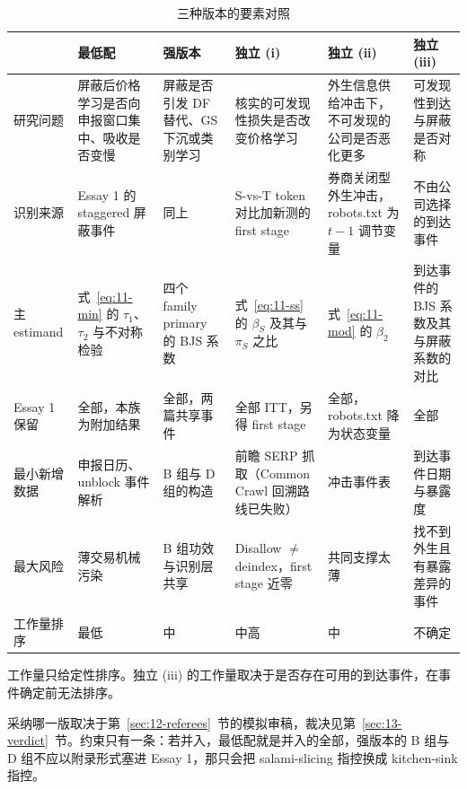 \documentclass[a4paper,11pt]{ctexart}
\begin{document}
\begin{table}[htbp]
\centering
\begin{threeparttable}
\caption{三种版本的要素对照}\label{tab:11-versions}
\footnotesize
\begin{tabular}{>{\raggedright\arraybackslash}p{1.7cm}>{\raggedright\arraybackslash}p{2.4cm}>{\raggedright\arraybackslash}p{2.4cm}>{\raggedright\arraybackslash}p{2.4cm}>{\raggedright\arraybackslash}p{2.4cm}>{\raggedright\arraybackslash}p{2.4cm}}
\toprule
 & 最低配 & 强版本 & 独立 (i) & 独立 (ii) & 独立 (iii) \\
\midrule
研究问题 & 屏蔽后价格学习是否向申报窗口集中、吸收是否变慢 & 屏蔽是否引发 DF 替代、GS 下沉或类别学习 & 核实的可发现性损失是否改变价格学习 & 外生信息供给冲击下，不可发现的公司是否恶化更多 & 可发现性到达与屏蔽是否对称 \\
识别来源 & Essay 1 的 staggered 屏蔽事件 & 同上 & S-vs-T token 对比加新测的 first stage & 券商关闭型外生冲击，robots.txt 为 $t-1$ 调节变量 & 不由公司选择的到达事件 \\
主 estimand & 式~\eqref{eq:11-min} 的 $\tau_1$、$\tau_2$ 与不对称检验 & 四个 family primary 的 BJS 系数 & 式~\eqref{eq:11-ss} 的 $\beta_S$ 及其与 $\pi_S$ 之比 & 式~\eqref{eq:11-mod} 的 $\beta_2$ & 到达事件的 BJS 系数及其与屏蔽系数的对比 \\
Essay 1 保留 & 全部，本族为附加结果 & 全部，两篇共享事件 & 全部 ITT，另得 first stage & 全部，robots.txt 降为状态变量 & 全部 \\
最小新增数据 & 申报日历、unblock 事件解析 & B 组与 D 组的构造 & 前瞻 SERP 抓取（Common Crawl 回溯路线已失败） & 冲击事件表 & 到达事件日期与暴露度 \\
最大风险 & 薄交易机械污染 & B 组功效与识别层共享 & Disallow $\neq$ deindex，first stage 近零 & 共同支撑太薄 & 找不到外生且有暴露差异的事件 \\
工作量排序 & 最低 & 中 & 中高 & 中 & 不确定 \\
\bottomrule
\end{tabular}
\begin{tablenotes}\footnotesize
\item 工作量只给定性排序。独立 (iii) 的工作量取决于是否存在可用的到达事件，在事件确定前无法排序。
\end{tablenotes}
\end{threeparttable}
\end{table}

采纳哪一版取决于第~\ref{sec:12-referees}~节的模拟审稿，裁决见第~\ref{sec:13-verdict}~节。约束只有一条：若并入，最低配就是并入的全部，强版本的 B 组与 D 组不应以附录形式塞进 Essay 1，那只会把 salami-slicing 指控换成 kitchen-sink 指控。
\clearpage
\end{document}
